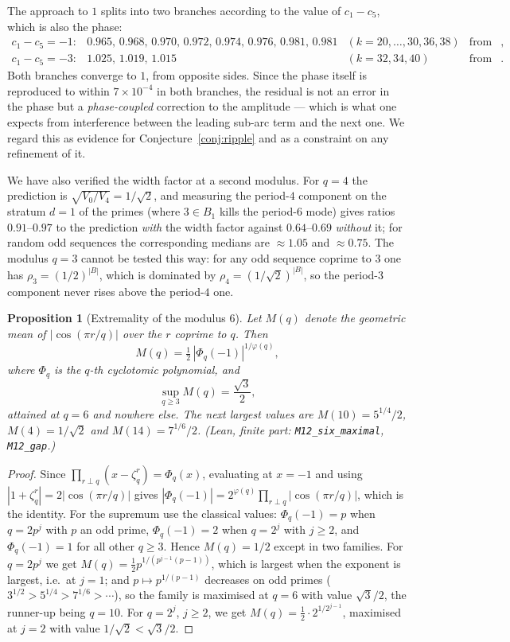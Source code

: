 \documentclass[11pt,a4paper]{article}
\theoremstyle{plain}
\newtheorem{proposition}[theorem]{Proposition}
\theoremstyle{definition}
\theoremstyle{remark}
\newcommand{\Lean}[1]{\texttt{#1}}
\begin{document}
The approach to $1$ splits into two branches according to the value of
$c_1-c_5$, which is also the phase:
\[
\begin{array}{llll}
  c_1-c_5=-1: & 0.965,\,0.968,\,0.970,\,0.972,\,0.974,\,0.976,\,0.981,\,0.981
    & (k=20,\dots,30,36,38) & \text{from below},\\[2pt]
  c_1-c_5=-3: & 1.025,\,1.019,\,1.015
    & (k=32,34,40) & \text{from above}.
\end{array}
\]
Both branches converge to $1$, from opposite sides. Since the phase itself is
reproduced to within $7\times10^{-4}$ in both branches, the residual is not an
error in the phase but a \emph{phase-coupled} correction to the amplitude ---
which is what one expects from interference between the leading sub-arc term and
the next one. We regard this as evidence for
Conjecture~\ref{conj:ripple} and as a constraint on any refinement of it.

We have also verified the width factor at a second modulus. For $q=4$ the
prediction is $\sqrt{V_0/V_4}=1/\sqrt2$, and measuring the period-$4$ component
on the stratum $d=1$ of the primes (where $3\in B_1$ kills the period-$6$ mode)
gives ratios $0.91$--$0.97$ to the prediction \emph{with} the width factor
against $0.64$--$0.69$ \emph{without} it; for random odd sequences the
corresponding medians are $\approx1.05$ and $\approx0.75$. The modulus $q=3$
cannot be tested this way: for any odd sequence coprime to $3$ one has
$\rho_3=(1/2)^{|B|}$, which is dominated by $\rho_4=(1/\sqrt2)^{|B|}$, so the
period-$3$ component never rises above the period-$4$ one.

\begin{proposition}[Extremality of the modulus $6$]\label{prop:mod6}
Let $M(q)$ denote the geometric mean of $|\cos(\pi r/q)|$ over the $r$ coprime
to $q$. Then
\[
  M(q)=\tfrac12\,|\Phi_q(-1)|^{1/\varphi(q)},
\]
where $\Phi_q$ is the $q$-th cyclotomic polynomial, and
\[
  \sup_{q\ge3}M(q)=\frac{\sqrt3}{2},
\]
attained at $q=6$ and nowhere else. The next largest values are
$M(10)=5^{1/4}/2$, $M(4)=1/\sqrt2$ and $M(14)=7^{1/6}/2$.
\textup{(Lean, finite part: \Lean{M12\_six\_maximal}, \Lean{M12\_gap}.)}
\end{proposition}

\begin{proof}
Since $\prod_{r\perp q}(x-\zeta_q^{r})=\Phi_q(x)$, evaluating at $x=-1$ and
using $|1+\zeta_q^{r}|=2|\cos(\pi r/q)|$ gives
$|\Phi_q(-1)|=2^{\varphi(q)}\prod_{r\perp q}|\cos(\pi r/q)|$, which is the
identity. For the supremum use the classical values: $\Phi_q(-1)=p$ when
$q=2p^{j}$ with $p$ an odd prime, $\Phi_q(-1)=2$ when $q=2^{j}$ with $j\ge2$,
and $\Phi_q(-1)=1$ for all other $q\ge3$. Hence $M(q)=1/2$ except in two
families. For $q=2p^{j}$ we get $M(q)=\tfrac12p^{1/(p^{j-1}(p-1))}$, which is
largest when the exponent is largest, i.e.\ at $j=1$; and
$p\mapsto p^{1/(p-1)}$ decreases on odd primes ($3^{1/2}>5^{1/4}>7^{1/6}>\cdots$),
so the family is maximised at $q=6$ with value $\sqrt3/2$, the runner-up being
$q=10$. For $q=2^{j}$, $j\ge2$, we get $M(q)=\tfrac12\cdot2^{1/2^{j-1}}$,
maximised at $j=2$ with value $1/\sqrt2<\sqrt3/2$.
\end{proof}
\end{document}
